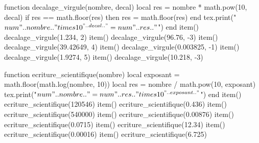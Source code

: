 \documentclass[../Cours.tex]{subfiles}
\begin{document}
\begin{listedexemples}
\begin{multicols}{2}
\begin{luacode}
    function decalage_virgule(nombre, decal)
        local res = nombre * math.pow(10, decal)
        if res == math.floor(res) then res = math.floor(res) end
        tex.print("$\\num{" .. nombre .. "} \\times 10^{" .. decal .. "} = \\num{" .. res .. "}$")
    end
    item() decalage_virgule(1.234, 2)
    item() decalage_virgule(96.76, -3)
    item() decalage_virgule(39.42649, 4)
    item() decalage_virgule(0.003825, -1)
    item() decalage_virgule(1.9274, 5)
    item() decalage_virgule(10.218, -3)
\end{luacode}
\end{multicols}
\end{listedexemples}



\begin{listedexemples}
\begin{multicols}{2}
\begin{luacode}
    function ecriture_scientifique(nombre)
        local exposant = math.floor(math.log(nombre, 10))
        local res = nombre / math.pow(10, exposant)
        tex.print("$\\num{" .. nombre .. "} = \\num{" .. res .. "} \\times 10^{" .. exposant .. "}$")
    end
    item() ecriture_scientifique(120546)
    item() ecriture_scientifique(0.436)
    item() ecriture_scientifique(540000)
    item() ecriture_scientifique(0.00876)
    item() ecriture_scientifique(0.0715)
    item() ecriture_scientifique(12.34)
    item() ecriture_scientifique(0.00016)
    item() ecriture_scientifique(6.725)
\end{luacode}
\end{multicols}
\end{listedexemples}
\end{document}

